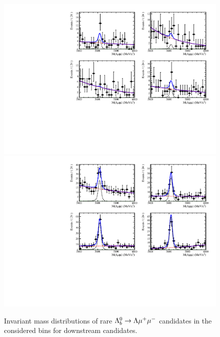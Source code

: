 \begin{figure}
\centering
\includegraphics[width=1.\textwidth]{Lmumu/figs/MassFits/q2_fits_DD_plot2.pdf}
\includegraphics[width=1.\textwidth]{Lmumu/figs/MassFits/q2_fits_DD_plot1.pdf}
\caption{Invariant mass distributions of rare $\Lambda^0_b\rightarrow\Lambda\mu^+\mu^-$ candidates in the considered \qsq bins
 for downstream candidates. }
\label{fig:Lb_differentialFitDD}
\end{figure}

